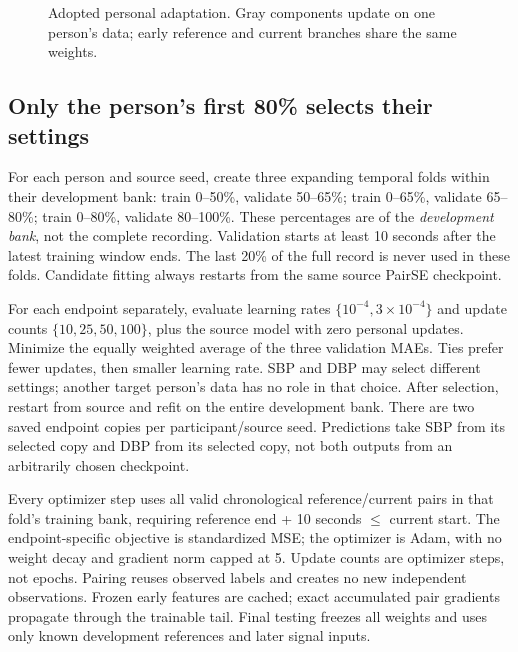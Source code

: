 \documentclass[conference]{IEEEtran}
\begin{document}
\begin{figure}[t]\centering
{}
\caption{Adopted personal adaptation. Gray components update on one person's
data; early reference and current branches share the same weights.}
\end{figure}

\subsection{Only the person's first 80\% selects their settings}
For each person and source seed, create three expanding temporal folds within
their development bank: train 0--50\%, validate 50--65\%; train 0--65\%, validate
65--80\%; train 0--80\%, validate 80--100\%. These percentages are of the
\emph{development bank}, not the complete recording. Validation starts at least
10 seconds after the latest training window ends. The last 20\% of the full
record is never used in these folds. Candidate fitting always restarts from
the same source PairSE checkpoint.

For each endpoint separately, evaluate learning rates $\{10^{-4},3\times10^{-4}\}$
and update counts $\{10,25,50,100\}$, plus the source model with zero personal
updates. Minimize the equally weighted average of the three validation MAEs.
Ties prefer fewer updates, then smaller learning rate. SBP and DBP may select
different settings; another target person's data has no role in that choice.
After selection, restart from source and refit on the entire development bank.
There are two saved endpoint copies per participant/source seed. Predictions
take SBP from its selected copy and DBP from its selected copy, not both outputs
from an arbitrarily chosen checkpoint.

Every optimizer step uses all valid chronological reference/current pairs in
that fold's training bank, requiring reference end + 10 seconds $\leq$ current
start. The endpoint-specific objective is standardized MSE; the optimizer is
Adam, with no weight decay and gradient norm capped at 5. Update counts are
optimizer steps, not epochs. Pairing reuses observed labels and creates no new
independent observations. Frozen early features are cached; exact accumulated
pair gradients propagate through the trainable tail. Final testing freezes all
weights and uses only known development references and later signal inputs.
\end{document}
